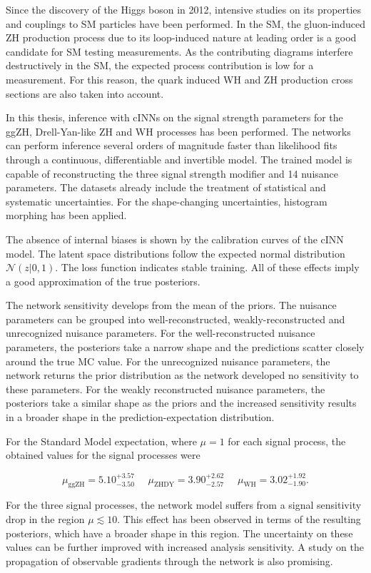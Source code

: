 \label{sec:conclusion}

Since the discovery of the Higgs boson in 2012, intensive studies on its properties and couplings to SM particles have been performed. In the SM, the gluon-induced ZH production process due to its loop-induced nature at leading order is a good candidate for SM testing measurements. As the contributing diagrams interfere destructively in the SM, the expected process contribution is low for a measurement. For this reason, the quark induced WH and ZH production cross sections are also taken into account.

In this thesis, inference with cINNs on the signal strength parameters for the ggZH, Drell-Yan-like ZH and WH processes has been performed. The networks can perform inference several orders of magnitude faster than likelihood fits through a continuous, differentiable and invertible model. The trained model is capable of reconstructing the three signal strength modifier and 14 nuisance parameters. The datasets already include the treatment of statistical and systematic uncertainties. For the shape-changing uncertainties, histogram morphing has been applied.

The absence of internal biases is shown by the calibration curves of the cINN model. The latent space distributions follow the expected normal distribution $\mathcal{N}(z | 0,1)$. The loss function indicates stable training. All of these effects imply a good approximation of the true posteriors.

The network sensitivity develops from the mean of the priors. The nuisance parameters can be grouped into well-reconstructed, weakly-reconstructed and unrecognized nuisance parameters. For the well-reconstructed nuisance parameters, the posteriors take a narrow shape and the predictions scatter closely around the true MC value. For the unrecognized nuisance parameters, the network returns the prior distribution as the network developed no sensitivity to these parameters. For the weakly reconstructed nuisance parameters, the posteriors take a similar shape as the priors and the increased sensitivity results in a broader shape in the prediction-expectation distribution.

For the Standard Model expectation, where $\mu=1$ for each signal process, the obtained values for the signal processes were

\begin{equation*}
	\mu_\text{ggZH} = 5.10^{+3.57}_{-3.50} \, \, \quad \mu_\text{ZHDY} = 3.90^{+2.62}_{-2.57} \, \, \quad \mu_\text{WH} = 3.02^{+1.92}_{-1.90}.
\end{equation*}

For the three signal processes, the network model suffers from a signal sensitivity drop in the region $\mu\lesssim10$. This effect has been observed in terms of the resulting posteriors, which have a broader shape in this region. The uncertainty on these values can be further improved with increased analysis sensitivity. A study on the propagation of observable gradients through the network is also promising.